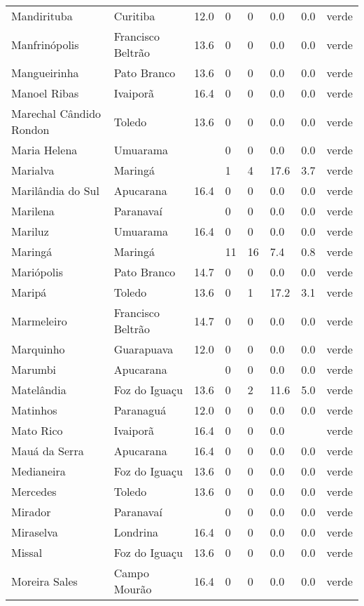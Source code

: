 \begin{longtable}{l|lllllll}
  Mandirituba & Curitiba & 12.0 & 0 & 0 & 0.0 & 0.0 & verde \\ 
  Manfrinópolis & Francisco Beltrão & 13.6 & 0 & 0 & 0.0 & 0.0 & verde \\ 
  Mangueirinha & Pato Branco & 13.6 & 0 & 0 & 0.0 & 0.0 & verde \\ 
  Manoel Ribas & Ivaiporã & 16.4 & 0 & 0 & 0.0 & 0.0 & verde \\ 
  Marechal Cândido Rondon & Toledo & 13.6 & 0 & 0 & 0.0 & 0.0 & verde \\ 
  Maria Helena & Umuarama &  & 0 & 0 & 0.0 & 0.0 & verde \\ 
  Marialva & Maringá &  & 1 & 4 & 17.6 & 3.7 & verde \\ 
  Marilândia do Sul & Apucarana & 16.4 & 0 & 0 & 0.0 & 0.0 & verde \\ 
  Marilena & Paranavaí &  & 0 & 0 & 0.0 & 0.0 & verde \\ 
  Mariluz & Umuarama & 16.4 & 0 & 0 & 0.0 & 0.0 & verde \\ 
  Maringá & Maringá &  & 11 & 16 & 7.4 & 0.8 & verde \\ 
  Mariópolis & Pato Branco & 14.7 & 0 & 0 & 0.0 & 0.0 & verde \\ 
  Maripá & Toledo & 13.6 & 0 & 1 & 17.2 & 3.1 & verde \\ 
  Marmeleiro & Francisco Beltrão & 14.7 & 0 & 0 & 0.0 & 0.0 & verde \\ 
  Marquinho & Guarapuava & 12.0 & 0 & 0 & 0.0 & 0.0 & verde \\ 
  Marumbi & Apucarana &  & 0 & 0 & 0.0 & 0.0 & verde \\ 
  Matelândia & Foz do Iguaçu & 13.6 & 0 & 2 & 11.6 & 5.0 & verde \\ 
  Matinhos & Paranaguá & 12.0 & 0 & 0 & 0.0 & 0.0 & verde \\ 
  Mato Rico & Ivaiporã & 16.4 & 0 & 0 & 0.0 &  & verde \\ 
  Mauá da Serra & Apucarana & 16.4 & 0 & 0 & 0.0 & 0.0 & verde \\ 
  Medianeira & Foz do Iguaçu & 13.6 & 0 & 0 & 0.0 & 0.0 & verde \\ 
  Mercedes & Toledo & 13.6 & 0 & 0 & 0.0 & 0.0 & verde \\ 
  Mirador & Paranavaí &  & 0 & 0 & 0.0 & 0.0 & verde \\ 
  Miraselva & Londrina & 16.4 & 0 & 0 & 0.0 & 0.0 & verde \\ 
  Missal & Foz do Iguaçu & 13.6 & 0 & 0 & 0.0 & 0.0 & verde \\ 
  Moreira Sales & Campo Mourão & 16.4 & 0 & 0 & 0.0 & 0.0 & verde \\ 

\end{longtable}
